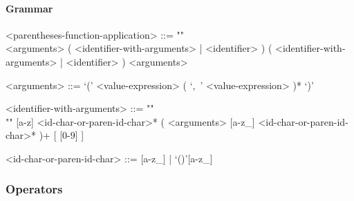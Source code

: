 \documentclass{article}
\begin{document}
\paragraph{Grammar}
\begin{grammar}
<parentheses-function-application> ::= ""\\
<arguments> ( <identifier-with-arguments> | <identifier> )
\alt ( <identifier-with-arguments> | <identifier> ) <arguments>

<arguments> ::= `(' <value-expression> ( `,\ ' <value-expression> )* `)'

<identifier-with-arguments> ::= ""\\""
[a-z] <id-char-or-paren-id-char>* ( <arguments> [a-z_]
<id-char-or-paren-id-char>* )+ [ [0-9] ]

<id-char-or-paren-id-char> ::= [a-z_] | `()'[a-z_]
\end{grammar}

\subsubsection{Operators}
\end{document}
